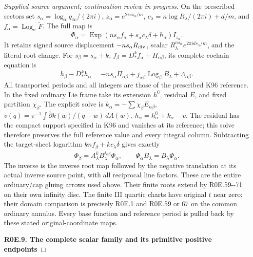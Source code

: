 \begin{proof}[Supplied source argument; continuation review in progress]
On the prescribed sectors set
\(s_\alpha=\log_\alpha q_\infty/(2\pi i)\),
\(z_\alpha=e^{2\pi i s_\alpha/m}\),
\(c_\lambda=n\log R_\lambda/(2\pi i)+d/m\), and
\(f_\alpha=\operatorname{Log}_\alpha\widetilde F\). The full map is
\[
 \Phi_\alpha=\operatorname{Exp}
 (n s_\alpha f_\alpha+s_\alpha c_\lambda\delta+h_\alpha)I_{z_\alpha}.
 \tag{R0E.72}
\]
It retains signed source displacement \(-n s_\alpha R_{\rm div}\),
scalar \(R_\lambda^{n s_\alpha}e^{2\pi i d s_\alpha/m}\), and the
literal root change. For \(s_\beta=s_\alpha+k\),
\(f_\beta=D_*^k f_\alpha+\Pi_{\alpha\beta}\), its complete
cochain equation is
\[
 h_\beta-D_*^kh_\alpha=-n s_\alpha\Pi_{\alpha\beta}
               +j_{\alpha\beta}\operatorname{Log}_\beta B_\lambda
               +\Lambda_{\alpha\beta}.
 \tag{R0E.73}
\]
All transported periods and all integers are those of the prescribed
K96 reference. In the fixed ordinary Lie frame take its extension
\(h^0\), residual \(E\), and fixed partition \(\chi_\beta\).
The explicit solve is
\(k_\alpha=-\sum\chi_\beta E_{\alpha\beta}\),
\(v(q)=\pi^{-1}\int\bar\partial k(w)/(q-w)\,dA(w)\),
\(h_\alpha=h_\alpha^0+k_\alpha-v\). The residual has the compact
support specified in K96 and vanishes at its reference; this solve
therefore preserves the full reference value and every integral
column. Subtracting the target-sheet logarithm
\(kn f_\beta+kc_\lambda\delta\) gives exactly
\[
 \Phi_\beta=A_\lambda^k B_\lambda^{j_{\alpha\beta}}\Phi_\alpha,
 \qquad \Phi_\alpha B_\lambda=B_\lambda\Phi_\alpha.
 \tag{R0E.74}
\]
The inverse is the inverse root map followed by the negative
translation at its actual inverse source point, with all reciprocal
line factors. These are the entire ordinary/cap gluing arrows used
above. Their finite roots extend by R0E.59-\/-71 on their own infinity
disc. The finite III quartic charts have original \(t\) near zero;
their domain comparison is precisely R0E.1 and R0E.59 or 67 on the
common ordinary annulus. Every base function and reference period
is pulled back by these stated original-coordinate maps.

\par

\medskip\noindent\textbf{R0E.9. The complete scalar family and its primitive positive endpoints}

\par\nobreak


\end{proof}
